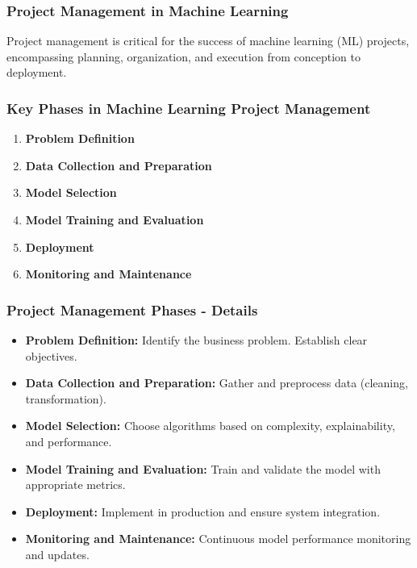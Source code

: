 \documentclass[aspectratio=169]{beamer}
\begin{document}
\begin{frame}[fragile]
    \frametitle{Project Management in Machine Learning}
    Project management is critical for the success of machine learning (ML) projects, encompassing planning, organization, and execution from conception to deployment. 
\end{frame}

\begin{frame}[fragile]
    \frametitle{Key Phases in Machine Learning Project Management}
    \begin{enumerate}
        \item \textbf{Problem Definition}
        \item \textbf{Data Collection and Preparation}
        \item \textbf{Model Selection}
        \item \textbf{Model Training and Evaluation}
        \item \textbf{Deployment}
        \item \textbf{Monitoring and Maintenance}
    \end{enumerate}
\end{frame}

\begin{frame}[fragile]
    \frametitle{Project Management Phases - Details}
    \begin{itemize}
        \item \textbf{Problem Definition:} Identify the business problem. Establish clear objectives.
        \item \textbf{Data Collection and Preparation:} Gather and preprocess data (cleaning, transformation).
        \item \textbf{Model Selection:} Choose algorithms based on complexity, explainability, and performance.
        \item \textbf{Model Training and Evaluation:} Train and validate the model with appropriate metrics.
        \item \textbf{Deployment:} Implement in production and ensure system integration.
        \item \textbf{Monitoring and Maintenance:} Continuous model performance monitoring and updates.
    \end{itemize}
\end{frame}
\end{document}
